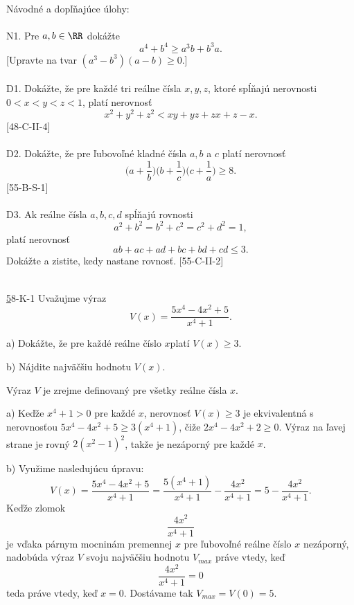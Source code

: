\\
Návodné a dopľňajúce úlohy:\\
\\
N1. Pre $a, b \in \RR$ dokážte $$a^4+ b^4\geq a^3b + b^3a.$$
[Upravte na tvar $(a^3 -  b^3)(a -  b)  \geq 0$.]\\
\\
D1. Dokážte, že pre každé tri reálne čísla $x, y, z$, ktoré spĺňajú nerovnosti $0 < x < y < z < 1$, platí nerovnosť $$x^2+ y^2+ z^2< xy + yz + zx + z-x.$$
[48-C-II-4]\\
\\
D2. Dokážte, že pre ľubovoľné kladné čísla $a, b$ a $c$ platí nerovnosť
$$\bigg( a +\frac{1}{b}\bigg)\bigg( b +\frac{1}{c}\bigg)\bigg( c +\frac{1}{a}\bigg)\geq 8.$$
[55-B-S-1]\\
\\
D3. Ak reálne čísla $a, b, c, d$ spĺňajú rovnosti
$$a^2+ b^2= b^2+ c^2= c^2+ d^2= 1,$$
platí nerovnosť
$$ab + ac + ad + bc + bd + cd \leq 3.$$
Dokážte a zistite, kedy nastane rovnosť. [55-C-II-2]\\
\\

\begin{tcolorbox}[breakable,notitle,boxrule=0pt,colback=light-gray,colframe=light-gray]\ul 58-K-1
 Uvažujme výraz $$V(x) =\frac{5x^4 - 4x^2 + 5}{x^4 + 1}.$$

a) Dokážte, že pre každé reálne číslo $x$platí $V (x) \geq 3$.

b) Nájdite najväčšiu hodnotu $V (x)$.

\end{tcolorbox}

\rie  Výraz $V$ je zrejme definovaný pre všetky reálne čísla $x$.

a) Keďže $x^4 +1 > 0$ pre každé $x$, nerovnosť $V (x) \geq 3$ je ekvivalentná s nerovnosťou $5x^4 - 4x^2 + 5 \geq 3(x^4 + 1)$, čiže $2x^4 - 4x^2 + 2 \geq 0$. Výraz na ľavej strane je rovný $2(x^2 - 1)^2$, takže je nezáporný pre každé $x$.

b) Využime nasledujúcu úpravu:
$$V (x) =\frac{5x^4 - 4x^2 + 5}{x^4 + 1}=\frac{5(x^4 +1)}{x^4 + 1}-\frac{4x^2}{x^4 + 1}=5-\frac{4x^2}{x^4 + 1}.$$
Keďže zlomok
$$\frac{4x^2}{x^4 + 1}$$
je vďaka párnym mocninám premennej $x$ pre ľubovoľné reálne číslo $x$ nezáporný, nadobúda výraz $V$ svoju najväčšiu hodnotu $V_{max}$ práve vtedy, keď
$$\frac{4x^2}{x^4 + 1}=0$$
teda práve vtedy, keď $x = 0$. Dostávame tak $V_{max} = V (0) = 5$.\\
\\

